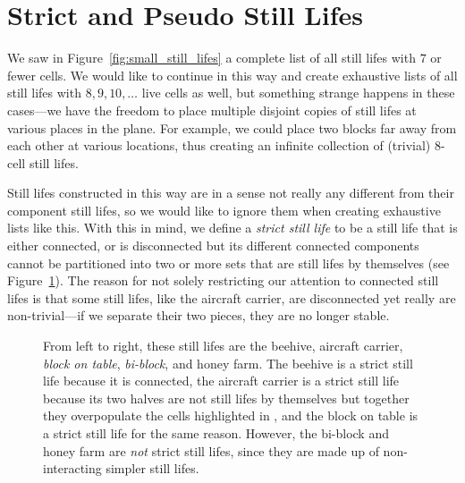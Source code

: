\section{Strict and Pseudo Still Lifes}\label{sec:pseudo_strict_still_lifes}

We saw in Figure~\ref{fig:small_still_lifes} a complete list of all still lifes with $7$ or fewer cells. We would like to continue in this way and create exhaustive lists of all still lifes with $8, 9, 10, \ldots$ live cells as well, but something strange happens in these cases---we have the freedom to place multiple disjoint copies of still lifes at various places in the plane. For example, we could place two blocks far away from each other at various locations, thus creating an infinite collection of (trivial) $8$-cell still lifes.

Still lifes constructed in this way are in a sense not really any different from their component still lifes, so we would like to ignore them when creating exhaustive lists like this. With this in mind, we define a \emph{strict still life} to be a still life that is either connected, or is disconnected but its different connected components cannot be partitioned into two or more sets that are still lifes by themselves (see Figure~\ref{fig:strict_non_strict}). The reason for not solely restricting our attention to connected still lifes is that some still lifes, like the aircraft carrier, are disconnected yet really are non-trivial---if we separate their two pieces, they are no longer stable.

\begin{figure}[!htb]
	\centering{}
	\caption{From left to right, these still lifes are the beehive, aircraft carrier, \emph{block on table}, \emph{bi-block}, and honey farm. The beehive is a strict still life because it is connected, the aircraft carrier is a strict still life because its two halves are not still lifes by themselves but together they overpopulate the cells highlighted in , and the block on table is a strict still life for the same reason. However, the bi-block and honey farm are \emph{not} strict still lifes, since they are made up of non-interacting simpler still lifes.}\label{fig:strict_non_strict}
\end{figure}

